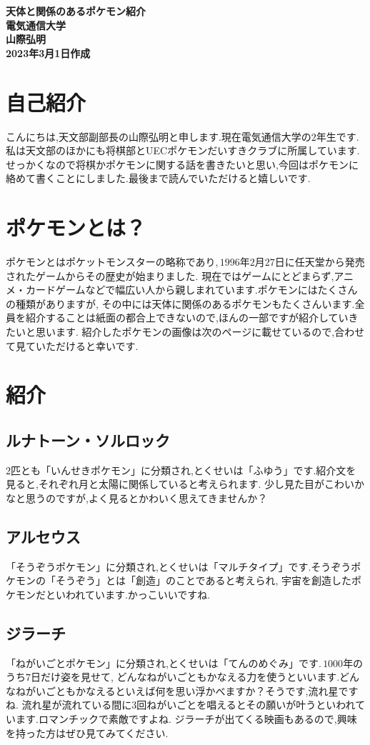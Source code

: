 \documentclass{article}
\begin{document}
\begin{center}
{\Large{\bf 天体と関係のあるポケモン紹介}} \\
{\bf 電気通信大学 \\
山際弘明} \\
{\bf 2023年3月1日作成}\\
\end{center}
\section{自己紹介}
こんにちは,天文部副部長の山際弘明と申します.現在電気通信大学の$2$年生です.私は天文部のほかにも将棋部とUECポケモンだいすきクラブに所属しています.
せっかくなので将棋かポケモンに関する話を書きたいと思い,今回はポケモンに絡めて書くことにしました.最後まで読んでいただけると嬉しいです.
\section{ポケモンとは？}
ポケモンとはポケットモンスターの略称であり,\,$1996$年$2$月$27$日に任天堂から発売されたゲームからその歴史が始まりました.
現在ではゲームにとどまらず,アニメ・カードゲームなどで幅広い人から親しまれています.ポケモンにはたくさんの種類がありますが,
その中には天体に関係のあるポケモンもたくさんいます.全員を紹介することは紙面の都合上できないので,ほんの一部ですが紹介していきたいと思います.
紹介したポケモンの画像は次のページに載せているので,合わせて見ていただけると幸いです.
\section{紹介}
\subsection{ルナトーン・ソルロック}
$2$匹とも「いんせきポケモン」に分類され,とくせいは「ふゆう」です.紹介文を見ると,それぞれ月と太陽に関係していると考えられます.
少し見た目がこわいかなと思うのですが,よく見るとかわいく思えてきませんか？
\subsection{アルセウス}
「そうぞうポケモン」に分類され,とくせいは「マルチタイプ」です.そうぞうポケモンの「そうぞう」とは「創造」のことであると考えられ,
宇宙を創造したポケモンだといわれています.かっこいいですね.
\subsection{ジラーチ}
「ねがいごとポケモン」に分類され,とくせいは「てんのめぐみ」です.\,$1000$年のうち$7$日だけ姿を見せて,
どんなねがいごともかなえる力を使うといいます.どんなねがいごともかなえるといえば何を思い浮かべますか？そうです,流れ星ですね.
流れ星が流れている間に$3$回ねがいごとを唱えるとその願いが叶うといわれています.ロマンチックで素敵ですよね.
ジラーチが出てくる映画もあるので,興味を持った方はぜひ見てみてください.
\end{document}
